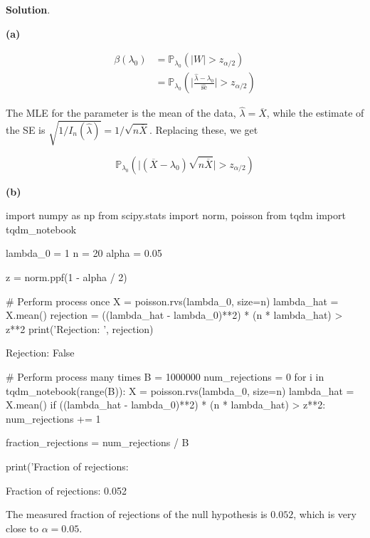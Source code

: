 \textbf{Solution}.

\textbf{(a)}

\begin{align*}
\beta(\lambda_{0}) &= \mathbb{P}_{\lambda_{0}}\left( |W| > z_{\alpha/2} \right)  \\
&= \mathbb{P}_{\lambda_{0}}\left( \Bigg| \frac{\hat{\lambda} - \lambda_{0}}{\hat{\text{se}}} \Bigg| > z_{\alpha/2} \right)
\end{align*}

The MLE for the parameter is the mean of the data,
\(\hat{\lambda} = \overline{X}\), while the estimate of the SE is
\(\sqrt{1 / I_{n}(\hat{\lambda})} = 1 / \sqrt{n\overline{X}}\). Replacing
these, we get

\[
\mathbb{P}_{\lambda_{0}}\left( \big| (\overline{X} - \lambda_{0})\sqrt{n \overline{X}} \big| > z_{\alpha/2} \right)
\]

\textbf{(b)}

\begin{python}
import numpy as np
from scipy.stats import norm, poisson
from tqdm import tqdm_{n}otebook

lambda_{0} = 1
n = 20
alpha = 0.05

z = norm.ppf(1 - alpha / 2)
\end{python}

\begin{python}
# Perform process once
X = poisson.rvs(lambda_{0}, size=n)
lambda_hat = X.mean()
rejection = ((lambda_hat - lambda_{0})**2) * (n * lambda_hat) > z**2
print('Rejection: ', rejection)
\end{python}

\begin{console}
Rejection:  False
\end{console}

\begin{python}
# Perform process many times
B = 1000000
num_rejections = 0
for i in tqdm_{n}otebook(range(B)):
    X = poisson.rvs(lambda_{0}, size=n)
    lambda_hat = X.mean()
    if ((lambda_hat - lambda_{0})**2) * (n * lambda_hat) > z**2:
        num_rejections += 1
        
fraction_rejections = num_rejections / B

print('Fraction of rejections: %
\end{python}

\begin{console}
Fraction of rejections: 0.052
\end{console}

The measured fraction of rejections of the null hypothesis is \(0.052\),
which is very close to \(\alpha = 0.05\).
